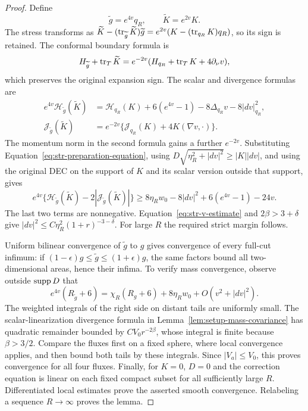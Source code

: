 \begin{proof}
Define
\[
 \widetilde g=e^{4v}q_R,\qquad \widetilde K=e^{2v}K.
\]
The stress transforms as
$\widetilde K-(\operatorname{tr}_{\widetilde g}\widetilde K)\widetilde g
=e^{2v}(K-(\operatorname{tr}_{q_R}K)q_R)$, so its sign is retained. The conformal
boundary formula is
\[
 H_{\widetilde g}+\operatorname{tr}_T\widetilde K
 =e^{-2v}(H_{q_R}+\operatorname{tr}_TK+4\partial_\nu v),
\]
which preserves the original expansion sign. The scalar and divergence
formulas are
\begin{align}
 e^{4v}\mathcal H_{\widetilde g}(\widetilde K)
 &=\mathcal H_{q_R}(K)+6(e^{4v}-1)
                       -8\Delta_{q_R}v-8|dv|_{q_R}^2,
 \label{eq:str-conformal-hamiltonian}\\
 \mathcal J_{\widetilde g}(\widetilde K)
 &=e^{-2v}\{\mathcal J_{q_R}(K)+4K(\nabla v,\cdot)\}.
 \label{eq:str-conformal-momentum}
\end{align}
The momentum norm in the second formula gains a further $e^{-2v}$.
Substituting Equation~\eqref{eq:str-preparation-equation}, using
$D\sqrt{\eta_R^2+|dv|^2}\geq |K||dv|$, and using the original DEC on
the support of $K$ and its scalar version outside that support, gives
\[
 e^{4v}\{\mathcal H_{\widetilde g}(\widetilde K)
                 -2|\mathcal J_{\widetilde g}(\widetilde K)|\}
 \geq8\eta_Rw_0-8|dv|^2+6(e^{4v}-1)-24v.
\]
The last two terms are nonnegative. Equation~\eqref{eq:str-v-estimate}
and $2\beta>3+\delta$ give
$|dv|^2\leq C\eta_R^2(1+r)^{-3-\delta}$. For large $R$ the required
strict margin follows.

Uniform bilinear convergence of $\widetilde g$ to $g$ gives convergence
of every full-cut infimum: if
$(1-\epsilon)g\leq\widetilde g\leq(1+\epsilon)g$, the same factors
bound all two-dimensional areas, hence their infima. To verify mass
convergence, observe outside $\operatorname{supp} D$ that
\[
 e^{4v}(R_{\widetilde g}+6)
 =\chi_R(R_g+6)+8\eta_Rw_0+O(v^2+|dv|^2).
\]
The weighted integrals of the right side on distant tails are uniformly
small. The scalar-linearization divergence formula in
Lemma~\ref{lem:setup-mass-covariance} has quadratic remainder bounded
by $C V_0r^{-2\beta}$, whose integral is finite because $\beta>3/2$.
Compare the fluxes first on a fixed sphere, where local convergence
applies, and then bound both tails by these integrals. Since
$|V_a|\leq V_0$, this proves convergence for all four fluxes.
Finally, for $K=0$, $D=0$ and the correction equation is linear on
each fixed compact subset for all sufficiently large $R$. Differentiated
local estimates prove the asserted smooth convergence. Relabeling a
sequence $R\to\infty$ proves the lemma.
\end{proof}

